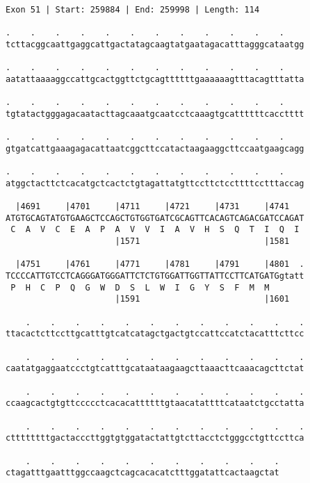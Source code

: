 \documentclass{article}
\begin{document}
\newpage
\begin{Verbatim}
Exon 51 | Start: 259884 | End: 259998 | Length: 114
 
.    .    .    .    .    .    .    .    .    .    .    .    
tcttacggcaattgaggcattgactatagcaagtatgaatagacatttagggcataatgg
  
.    .    .    .    .    .    .    .    .    .    .    .    
aatattaaaaggccattgcactggttctgcagttttttgaaaaaagtttacagtttatta
  
.    .    .    .    .    .    .    .    .    .    .    .    
tgtatactgggagacaatacttagcaaatgcaatcctcaaagtgcattttttcacctttt
  
.    .    .    .    .    .    .    .    .    .    .    .    
gtgatcattgaaagagacattaatcggcttccatactaagaaggcttccaatgaagcagg
  
.    .    .    .    .    .    .    .    .    .    .    .    
atggctacttctcacatgctcactctgtagattatgttccttctccttttcctttaccag
  
  |4691     |4701     |4711     |4721     |4731     |4741   
ATGTGCAGTATGTGAAGCTCCAGCTGTGGTGATCGCAGTTCACAGTCAGACGATCCAGAT
 C  A  V  C  E  A  P  A  V  V  I  A  V  H  S  Q  T  I  Q  I 
                      |1571                         |1581   
  
  |4751     |4761     |4771     |4781     |4791     |4801  .
TCCCCATTGTCCTCAGGGATGGGATTCTCTGTGGATTGGTTATTCCTTCATGATGgtatt
 P  H  C  P  Q  G  W  D  S  L  W  I  G  Y  S  F  M  M       
                      |1591                         |1601   
  
    .    .    .    .    .    .    .    .    .    .    .    .
ttacactcttccttgcatttgtcatcatagctgactgtccattccatctacatttcttcc
  
    .    .    .    .    .    .    .    .    .    .    .    .
caatatgaggaatccctgtcatttgcataataagaagcttaaacttcaaacagcttctat
  
    .    .    .    .    .    .    .    .    .    .    .    .
ccaagcactgtgttccccctcacacattttttgtaacatattttcataatctgcctatta
  
    .    .    .    .    .    .    .    .    .    .    .    .
cttttttttgactacccttggtgtggatactattgtcttacctctgggcctgttccttca
  
    .    .    .    .    .    .    .    .    .    .    .
ctagatttgaatttggccaagctcagcacacatctttggatattcactaagctat
\end{Verbatim}
\newpage
\end{document}
